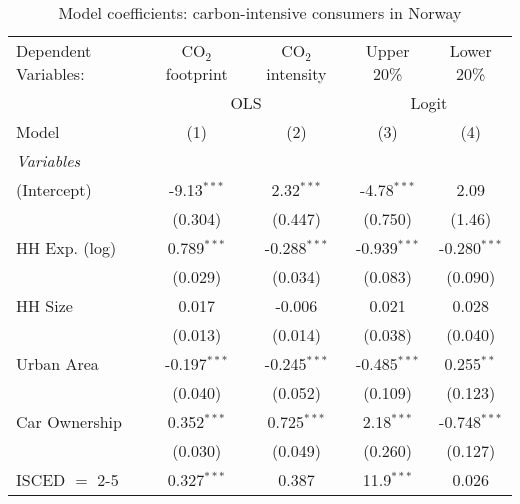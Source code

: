 
\begin{table}[htbp!]
   \centering
   \small
   \begin{adjustbox}{width = 1\textwidth, max height = 0.95\textheight, center}
      \begin{threeparttable}[b]
         \caption{\label{tab:Logit_1_NOR} Model coefficients: carbon-intensive consumers in Norway}
         \begin{tabular}{lcccc}
            \tabularnewline \midrule \midrule
            Dependent Variables: & CO$_{2}$ footprint & CO$_{2}$ intensity & Upper 20\%     & Lower 20\%\\   
             & \multicolumn{2}{c}{OLS} & \multicolumn{2}{c}{Logit} \\ 
            Model                & (1)                & (2)                & (3)            & (4)\\  
            \midrule
            \emph{Variables}\\
            (Intercept)          & -9.13$^{***}$      & 2.32$^{***}$       & -4.78$^{***}$  & 2.09\\   
                                 & (0.304)            & (0.447)            & (0.750)        & (1.46)\\   
            HH Exp. (log)        & 0.789$^{***}$      & -0.288$^{***}$     & -0.939$^{***}$ & -0.280$^{***}$\\   
                                 & (0.029)            & (0.034)            & (0.083)        & (0.090)\\   
            HH Size              & 0.017              & -0.006             & 0.021          & 0.028\\   
                                 & (0.013)            & (0.014)            & (0.038)        & (0.040)\\   
            Urban Area           & -0.197$^{***}$     & -0.245$^{***}$     & -0.485$^{***}$ & 0.255$^{**}$\\   
                                 & (0.040)            & (0.052)            & (0.109)        & (0.123)\\   
            Car Ownership        & 0.352$^{***}$      & 0.725$^{***}$      & 2.18$^{***}$   & -0.748$^{***}$\\   
                                 & (0.030)            & (0.049)            & (0.260)        & (0.127)\\   
            ISCED $=$ 2-5        & 0.327$^{***}$      & 0.387              & 11.9$^{***}$   & 0.026\\   

\end{tabular}
\end{threeparttable}
\end{adjustbox}
\end{table}
